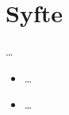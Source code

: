 \section{Syfte}
\label{sec:Aim}
\noindent
\dots
\begin{itemize}
    \item \dots
    \item \dots
\end{itemize}
